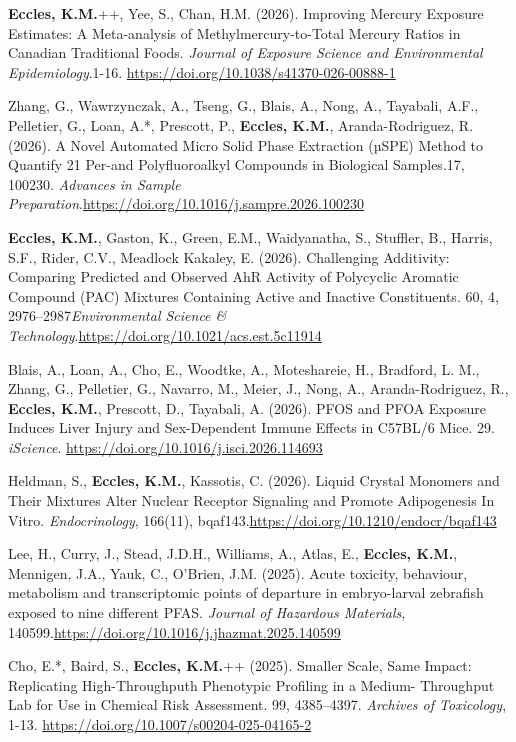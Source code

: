 \documentclass[margin,line]{res}
\begin{document}
\begin{resume}
\textbf{Eccles, K.M.}++, Yee, S., Chan, H.M. (2026). Improving Mercury Exposure Estimates: A Meta-analysis of Methylmercury-to-Total Mercury Ratios in Canadian Traditional Foods. \textit{Journal of Exposure Science and Environmental Epidemiology}.1-16. \url{https://doi.org/10.1038/s41370-026-00888-1}

Zhang, G., Wawrzynczak, A., Tseng, G., Blais, A., Nong, A., Tayabali, A.F., Pelletier, G., Loan, A.*, Prescott, P., \textbf{Eccles, K.M.}, Aranda-Rodriguez, R. (2026). A Novel Automated Micro Solid Phase Extraction (µSPE) Method to Quantify 21 Per-and Polyfluoroalkyl Compounds in Biological Samples.17, 100230. \textit{Advances in Sample Preparation}.\url{https://doi.org/10.1016/j.sampre.2026.100230}

\textbf{Eccles, K.M.}, Gaston, K., Green, E.M., Waidyanatha, S., Stuffler, B., Harris, S.F., Rider, C.V., Meadlock Kakaley, E. (2026). Challenging Additivity: Comparing Predicted and Observed AhR Activity of Polycyclic Aromatic Compound (PAC) Mixtures Containing Active and Inactive Constituents. 60, 4, 2976–2987\textit{Environmental Science \& Technology}.\url{https://doi.org/10.1021/acs.est.5c11914}

Blais, A., Loan, A., Cho, E., Woodtke, A., Moteshareie, H., Bradford, L. M., Zhang, G., Pelletier, G., Navarro, M., Meier, J., Nong, A., Aranda-Rodriguez, R., \textbf{Eccles, K.M.}, Prescott, D., Tayabali, A. (2026). PFOS and PFOA Exposure Induces Liver Injury and Sex-Dependent Immune Effects in C57BL/6 Mice. 29.  \textit{iScience}. \url{https://doi.org/10.1016/j.isci.2026.114693}

Heldman, S., \textbf{Eccles, K.M.}, Kassotis, C. (2026). Liquid Crystal Monomers and Their Mixtures Alter Nuclear Receptor Signaling and Promote Adipogenesis In Vitro. \textit{Endocrinology}, 166(11), bqaf143.\url{https://doi.org/10.1210/endocr/bqaf143}

Lee, H., Curry, J., Stead, J.D.H., Williams, A., Atlas, E., \textbf{Eccles, K.M.}, Mennigen, J.A., Yauk, C., O'Brien, J.M. (2025). Acute toxicity, behaviour, metabolism and transcriptomic points of departure in embryo-larval zebrafish exposed to nine different PFAS. \textit{Journal of Hazardous Materials}, 140599.\url{https://doi.org/10.1016/j.jhazmat.2025.140599}

Cho, E.*, Baird, S., \textbf{Eccles, K.M.}++ (2025). Smaller Scale, Same Impact: Replicating High-Throughputh Phenotypic Profiling in a Medium- Throughput Lab for Use in Chemical Risk Assessment. 99, 4385–4397. \textit{Archives of Toxicology}, 1-13. \url{https://doi.org/10.1007/s00204-025-04165-2}


\end{resume}
\end{document}
